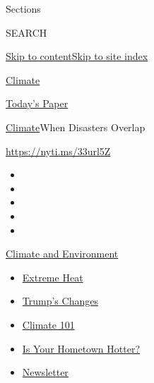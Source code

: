 Sections

SEARCH

\protect\hyperlink{site-content}{Skip to
content}\protect\hyperlink{site-index}{Skip to site index}

\href{https://www.nytimes.com/section/climate}{Climate}

\href{https://myaccount.nytimes.com/auth/login?response_type=cookie\&client_id=vi}{}

\href{https://www.nytimes.com/section/todayspaper}{Today's Paper}

\href{/section/climate}{Climate}\textbar{}When Disasters Overlap

\href{https://nyti.ms/33url5Z}{https://nyti.ms/33url5Z}

\begin{itemize}
\item
\item
\item
\item
\item
\end{itemize}

\href{https://www.nytimes.com/section/climate?action=click\&pgtype=Article\&state=default\&region=TOP_BANNER\&context=storylines_menu}{Climate
and Environment}

\begin{itemize}
\tightlist
\item
  \href{https://www.nytimes.com/interactive/2020/08/06/climate/climate-change-inequality-heat.html?action=click\&pgtype=Article\&state=default\&region=TOP_BANNER\&context=storylines_menu}{Extreme
  Heat}
\item
  \href{https://www.nytimes.com/interactive/2020/climate/trump-environment-rollbacks.html?action=click\&pgtype=Article\&state=default\&region=TOP_BANNER\&context=storylines_menu}{Trump's
  Changes}
\item
  \href{https://www.nytimes.com/interactive/2020/04/19/climate/climate-crash-course-1.html?action=click\&pgtype=Article\&state=default\&region=TOP_BANNER\&context=storylines_menu}{Climate
  101}
\item
  \href{https://www.nytimes.com/interactive/2018/08/30/climate/how-much-hotter-is-your-hometown.html?action=click\&pgtype=Article\&state=default\&region=TOP_BANNER\&context=storylines_menu}{Is
  Your Hometown Hotter?}
\item
  \href{https://www.nytimes.com/newsletters/climate-change?action=click\&pgtype=Article\&state=default\&region=TOP_BANNER\&context=storylines_menu}{Newsletter}
\end{itemize}

